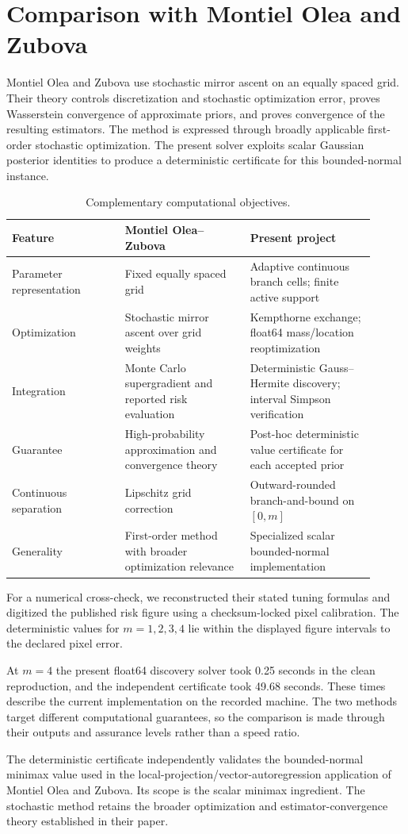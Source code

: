\section{Comparison with Montiel Olea and Zubova}
\label{sec:comparison}

Montiel Olea and Zubova \cite{montielzubova2026} use stochastic mirror ascent
on an equally spaced grid.  Their theory controls discretization and
stochastic optimization error, proves Wasserstein convergence of approximate
priors, and proves convergence of the resulting estimators.  The method is
expressed through broadly applicable first-order stochastic optimization.
The present solver exploits scalar Gaussian posterior identities to produce a
deterministic certificate for this bounded-normal instance.

\begin{table}[ht]
\centering
\caption{Complementary computational objectives.}
\label{tab:moz-comparison}
\small
\begin{tabular}{p{0.29\linewidth}p{0.31\linewidth}p{0.31\linewidth}}
\toprule
Feature & Montiel Olea--Zubova & Present project \\
\midrule
Parameter representation & Fixed equally spaced grid &
Adaptive continuous branch cells; finite active support\\
Optimization & Stochastic mirror ascent over grid weights &
Kempthorne exchange; float64 mass/location reoptimization\\
Integration & Monte Carlo supergradient and reported risk evaluation &
Deterministic Gauss--Hermite discovery; interval Simpson verification\\
Guarantee & High-probability approximation and convergence theory &
Post-hoc deterministic value certificate for each accepted prior\\
Continuous separation & Lipschitz grid correction &
Outward-rounded branch-and-bound on $[0,m]$\\
Generality & First-order method with broader optimization relevance &
Specialized scalar bounded-normal implementation\\
\bottomrule
\end{tabular}
\end{table}

For a numerical cross-check, we reconstructed their stated tuning formulas and
digitized the published risk figure using a checksum-locked pixel calibration.
The deterministic values for $m=1,2,3,4$ lie within the displayed figure
intervals to the declared pixel error.

At $m=4$ the present float64 discovery solver took 0.25 seconds in the clean
reproduction, and the independent certificate took 49.68 seconds.  These
times describe the current implementation on the recorded machine.  The two
methods target different computational guarantees, so the comparison is made
through their outputs and assurance levels rather than a speed ratio.

The deterministic certificate independently validates the bounded-normal
minimax value used in the local-projection/vector-autoregression application
of Montiel Olea and Zubova.  Its scope is the scalar minimax ingredient.  The
stochastic method retains the broader optimization and estimator-convergence
theory established in their paper.
